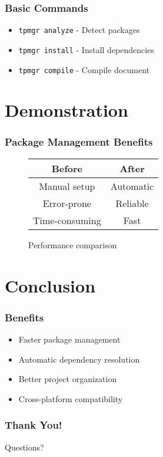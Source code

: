 \documentclass{beamer}
\begin{document}
\begin{frame}[fragile]
\frametitle{Basic Commands}
\begin{itemize}
    \item \texttt{tpmgr analyze} - Detect packages
    \item \texttt{tpmgr install} - Install dependencies
    \item \texttt{tpmgr compile} - Compile document
\end{itemize}
\end{frame}

\section{Demonstration}

\begin{frame}
\frametitle{Package Management Benefits}
\begin{figure}
    \centering
    \begin{tabular}{|c|c|}
        \hline
        \textbf{Before} & \textbf{After} \\
        \hline
        Manual setup & Automatic \\
        Error-prone & Reliable \\
        Time-consuming & Fast \\
        \hline
    \end{tabular}
    \caption{Performance comparison}
\end{figure}
\end{frame}

\section{Conclusion}

\begin{frame}
\frametitle{Benefits}
\begin{itemize}
    \item Faster package management
    \item Automatic dependency resolution
    \item Better project organization
    \item Cross-platform compatibility
\end{itemize}
\end{frame}

\begin{frame}
\frametitle{Thank You!}
\begin{center}
\Large Questions?
\end{center}
\end{frame}
\end{document}
